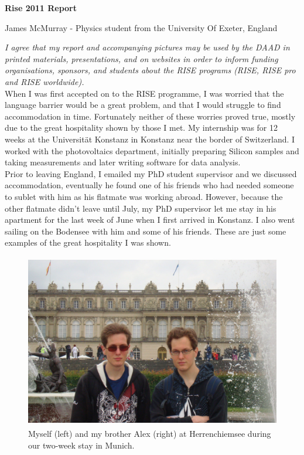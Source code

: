 \documentclass[final,a4paper,oneside,12pt]{article}
\begin{document}
\centerline{\Large \bf{Rise 2011 Report}}
\bigskip
\centerline{James McMurray - Physics student from the University Of Exeter, England}
\bigskip


\emph{I agree that my report and accompanying pictures may be used by the DAAD in printed materials, presentations, and on websites in order to inform funding organisations, sponsors, and students about the RISE programs (RISE, RISE pro and RISE worldwide).}\\

When I was first accepted on to the RISE programme, I was worried that the language barrier would be a great problem, and that I would struggle to find accommodation in time. Fortunately neither of these worries proved true, mostly due to the great hospitality shown by those I met. My internship was for 12 weeks at the Universität Konstanz in Konstanz near the border of Switzerland. I worked with the photovoltaics department, initially preparing Silicon samples and taking measurements and later writing software for data analysis.\\

Prior to leaving England, I emailed my PhD student supervisor and we discussed accommodation, eventually he found one of his friends who had needed someone to sublet with him as his flatmate was working abroad. However, because the other flatmate didn't leave until July, my PhD supervisor let me stay in his apartment for the last week of June when I first arrived in Konstanz. I also went sailing on the Bodensee with him and some of his friends. These are just some examples of the great hospitality I was shown.\\

\begin{center}
\begin{figure}[htp]
\centering
\includegraphics[height=3in]{herrenchiemsee}
\caption{\label{figure2} Myself (left) and my brother Alex (right) at Herrenchiemsee during our two-week stay in Munich.}
\end{figure}
\end{center}
\end{document}
